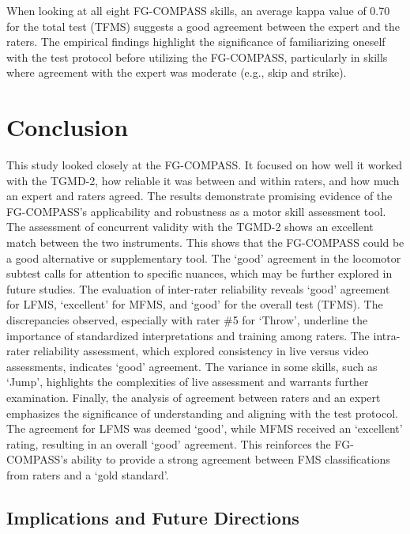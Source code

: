 \documentclass[
  man,
  colorlinks=true,linkcolor=blue,citecolor=blue,urlcolor=blue]{apa7}
\begin{document}
When looking at all eight FG-COMPASS skills, an average kappa value of
0.70 for the total test (TFMS) suggests a good agreement between the
expert and the raters. The empirical findings highlight the significance
of familiarizing oneself with the test protocol before utilizing the
FG-COMPASS, particularly in skills where agreement with the expert was
moderate (e.g., skip and strike).

\hypertarget{conclusion}{%
\section{Conclusion}\label{conclusion}}

This study looked closely at the FG-COMPASS. It focused on how well it
worked with the TGMD-2, how reliable it was between and within raters,
and how much an expert and raters agreed. The results demonstrate
promising evidence of the FG-COMPASS's applicability and robustness as a
motor skill assessment tool. The assessment of concurrent validity with
the TGMD-2 shows an excellent match between the two instruments. This
shows that the FG-COMPASS could be a good alternative or supplementary
tool. The `good' agreement in the locomotor subtest calls for attention
to specific nuances, which may be further explored in future studies.
The evaluation of inter-rater reliability reveals `good' agreement for
LFMS, `excellent' for MFMS, and `good' for the overall test (TFMS). The
discrepancies observed, especially with rater \#5 for `Throw', underline
the importance of standardized interpretations and training among
raters. The intra-rater reliability assessment, which explored
consistency in live versus video assessments, indicates `good'
agreement. The variance in some skills, such as `Jump', highlights the
complexities of live assessment and warrants further examination.
Finally, the analysis of agreement between raters and an expert
emphasizes the significance of understanding and aligning with the test
protocol. The agreement for LFMS was deemed `good', while MFMS received
an `excellent' rating, resulting in an overall `good' agreement. This
reinforces the FG-COMPASS's ability to provide a strong agreement
between FMS classifications from raters and a `gold standard'.

\hypertarget{implications-and-future-directions}{%
\subsection{Implications and Future
Directions}\label{implications-and-future-directions}}
\end{document}
